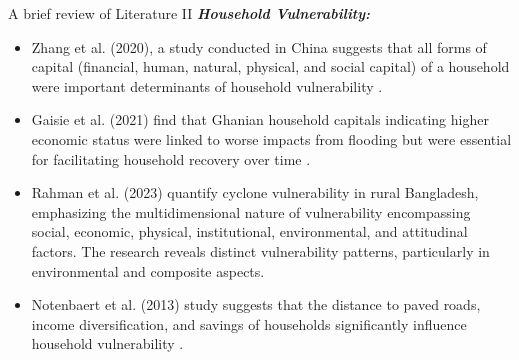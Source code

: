 \documentclass{beamer}
\newcommand{\coloredcite}[2]{\textcolor{blue}{\cite{#2}}}
\begin{document}
	\begin{frame}[t]{A brief review of Literature II }
		\textbf{\textit{Household Vulnerability:}}
		\begin{itemize}
			\item \begin{justify} \small Zhang et al. (2020), a study conducted in China suggests that all forms of capital (financial, human, natural, physical, and social capital) of a household were important determinants of household vulnerability \small\coloredcite{}{r25}.
			\end{justify}
			\item \begin{justify} \small Gaisie et al. (2021) find that Ghanian household capitals indicating higher economic status were linked to worse impacts from flooding but were essential for facilitating household recovery over time \small\coloredcite{}{r26}.\end{justify}
			\item \small Rahman et al. (2023) quantify cyclone vulnerability in rural Bangladesh, emphasizing the multidimensional nature of vulnerability encompassing social, economic, physical, institutional, environmental, and attitudinal factors. The research reveals distinct vulnerability patterns, particularly in environmental and composite aspects\small\coloredcite{}{r27}.
			
			\item \small Notenbaert et al. (2013) study suggests that the distance to paved roads, income diversification, and savings of households significantly influence household vulnerability \small\coloredcite{}{r28}.
		\end{itemize}
	\end{frame}
	
\end{document}
